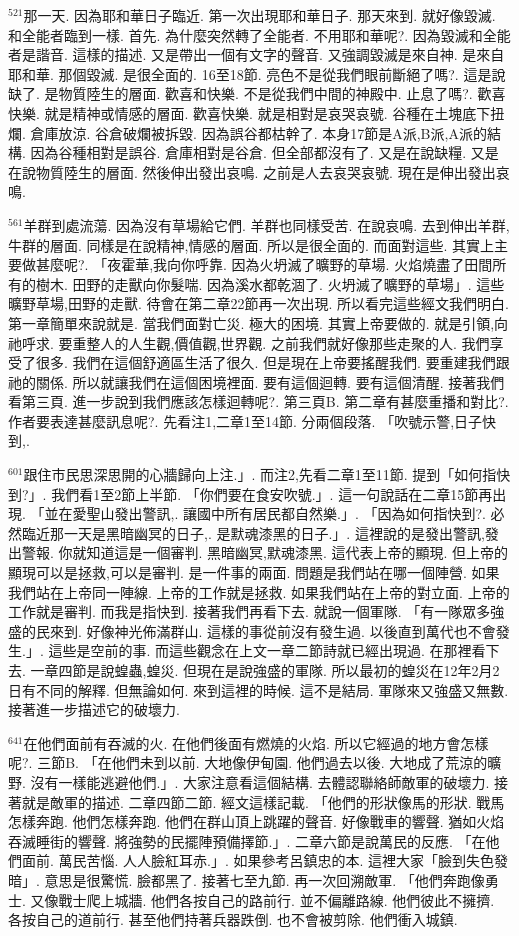 \documentclass{book}
\begin{document}
$^{521}$那一天.
因為耶和華日子臨近.
第一次出現耶和華日子.
那天來到.
就好像毀滅.
和全能者臨到一樣.
首先.
為什麼突然轉了全能者.
不用耶和華呢?.
因為毀滅和全能者是諧音.
這樣的描述.
又是帶出一個有文字的聲音.
又強調毀滅是來自神.
是來自耶和華.
那個毀滅.
是很全面的.
16至18節.
亮色不是從我們眼前斷絕了嗎?.
這是說缺了.
是物質陸生的層面.
歡喜和快樂.
不是從我們中間的神殿中.
止息了嗎?.
歡喜快樂.
就是精神或情感的層面.
歡喜快樂.
就是相對是哀哭哀號.
谷種在土塊底下扭爛.
倉庫放涼.
谷倉破爛被拆毀.
因為誤谷都枯幹了.
本身17節是A派,B派,A派的結構.
因為谷種相對是誤谷.
倉庫相對是谷倉.
但全部都沒有了.
又是在說缺糧.
又是在說物質陸生的層面.
然後伸出發出哀鳴.
之前是人去哀哭哀號.
現在是伸出發出哀鳴.

$^{561}$羊群到處流蕩.
因為沒有草場給它們.
羊群也同樣受苦.
在說哀鳴.
去到伸出羊群,牛群的層面.
同樣是在說精神,情感的層面.
所以是很全面的.
而面對這些.
其實上主要做甚麼呢?.
「夜霍華,我向你呼靠.
因為火坍滅了曠野的草場.
火焰燒盡了田間所有的樹木.
田野的走獸向你髮喘.
因為溪水都乾涸了.
火坍滅了曠野的草場」.
這些曠野草場,田野的走獸.
待會在第二章22節再一次出現.
所以看完這些經文我們明白.
第一章簡單來說就是.
當我們面對亡災.
極大的困境.
其實上帝要做的.
就是引領,向祂呼求.
要重整人的人生觀,價值觀,世界觀.
之前我們就好像那些走聚的人.
我們享受了很多.
我們在這個舒適區生活了很久.
但是現在上帝要搖醒我們.
要重建我們跟祂的關係.
所以就讓我們在這個困境裡面.
要有這個迴轉.
要有這個清醒.
接著我們看第三頁.
進一步說到我們應該怎樣迴轉呢?.
第三頁B.
第二章有甚麼重播和對比?.
作者要表達甚麼訊息呢?.
先看注1,二章1至14節.
分兩個段落.
「吹號示警,日子快到,.

$^{601}$跟住市民思深思開的心牆歸向上注.」.
而注2,先看二章1至11節.
提到「如何指快到?」.
我們看1至2節上半節.
「你們要在食安吹號.」.
這一句說話在二章15節再出現.
「並在愛聖山發出警訊,.
讓國中所有居民都自然樂.」.
「因為如何指快到?.
必然臨近那一天是黑暗幽冥的日子,.
是默魂漆黑的日子.」.
這裡說的是發出警訊,發出警報.
你就知道這是一個審判.
黑暗幽冥,默魂漆黑.
這代表上帝的顯現.
但上帝的顯現可以是拯救,可以是審判.
是一件事的兩面.
問題是我們站在哪一個陣營.
如果我們站在上帝同一陣線.
上帝的工作就是拯救.
如果我們站在上帝的對立面.
上帝的工作就是審判.
而我是指快到.
接著我們再看下去.
就說一個軍隊.
「有一隊眾多強盛的民來到.
好像神光佈滿群山.
這樣的事從前沒有發生過.
以後直到萬代也不會發生.」.
這些是空前的事.
而這些觀念在上文一章二節詩就已經出現過.
在那裡看下去.
一章四節是說蝗蟲,蝗災.
但現在是說強盛的軍隊.
所以最初的蝗災在12年2月2日有不同的解釋.
但無論如何.
來到這裡的時候.
這不是結局.
軍隊來又強盛又無數.
接著進一步描述它的破壞力.

$^{641}$在他們面前有吞滅的火.
在他們後面有燃燒的火焰.
所以它經過的地方會怎樣呢?.
三節B.
「在他們未到以前.
大地像伊甸園.
他們過去以後.
大地成了荒涼的曠野.
沒有一樣能逃避他們.」.
大家注意看這個結構.
去體認聯絡師敵軍的破壞力.
接著就是敵軍的描述.
二章四節二節.
經文這樣記載.
「他們的形狀像馬的形狀.
戰馬怎樣奔跑.
他們怎樣奔跑.
他們在群山頂上跳躍的聲音.
好像戰車的響聲.
猶如火焰吞滅睡街的響聲.
將強勢的民擺陣預備擇節.」.
二章六節是說萬民的反應.
「在他們面前.
萬民苦惱.
人人臉紅耳赤.」.
如果參考呂鎮忠的本.
這裡大家「臉到失色發暗」.
意思是很驚慌.
臉都黑了.
接著七至九節.
再一次回溯敵軍.
「他們奔跑像勇士.
又像戰士爬上城牆.
他們各按自己的路前行.
並不偏離路線.
他們彼此不擁擠.
各按自己的道前行.
甚至他們持著兵器跌倒.
也不會被剪除.
他們衝入城鎮.
\end{document}
